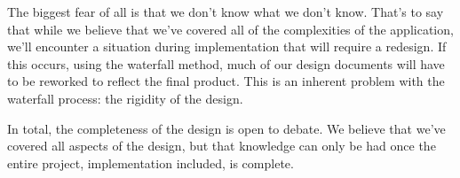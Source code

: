 \documentclass[a4paper]{report}
\begin{document}
	The biggest fear of all is that we don't know what we don't know. That's to say that while we believe that we've covered all of the complexities of the application, we'll encounter a situation during implementation that will require a redesign. If this occurs, using the waterfall method, much of our design documents will have to be reworked to reflect the final product. This is an inherent problem with the waterfall process: the rigidity of the design.

	In total, the completeness of the design is open to debate. We believe that we've covered all aspects of the design, but that knowledge can only be had once the entire project, implementation included, is complete.
\end{document}
